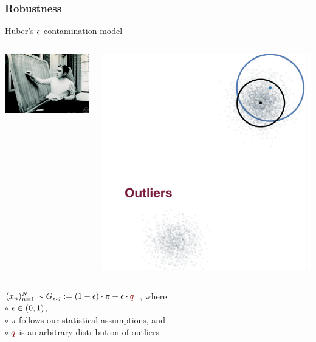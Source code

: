 \documentclass[hyperref={colorlinks = true},unknownkeysallowed]{beamer}
\let\oldcitep=\citep
\renewcommand\citep[1]{\hypersetup{linkcolor=darkred}\hyperlink{#1}{\oldcitep{#1}}}
\begin{document}
\begin{frame}
	\frametitle{Robustness}
	Huber's $\epsilon$-contamination model
	\begin{columns}
		\begin{column}{.39\textwidth}
			\hfill \includegraphics[width=1.\textwidth]{figs/Huber.jpg}\\ 
		\end{column}
		\begin{column}{.69\textwidth}
			\hfill \includegraphics[width=.5\textwidth]{figs/contaminated-gaussian.png}\\ 
		\end{column}
	\end{columns}
	$(x_n)_{n=1}^{N}\sim G_{\eps, q}:= (1-\eps)\cdot \pi + \eps \cdot \color{darkred}{q}$~\citep{huber92},
	where
	\\  $\circ$ $\epsilon \in (0,1)$, 
	\\  $\circ$ $\pi$ follows our statistical assumptions, and 
	\\  $\circ$ $\color{darkred}{q}$ is an arbitrary distribution of outliers
\end{frame}
\end{document}
